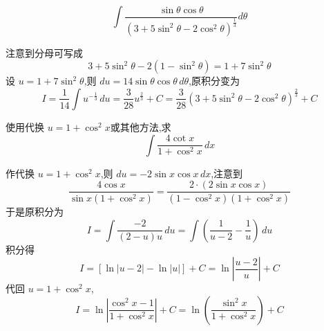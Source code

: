 \begin{questions}
    \question 
    \[
    \int \frac{\sin \theta \cos \theta}{(3+5\sin^2 \theta - 2\cos^2 \theta)^{\frac{1}{3}}} d\theta
    \]
    \begin{solution}
        注意到分母可写成
        \[ 
        3 + 5\sin^2 \theta - 2(1 - \sin^2 \theta) = 1 + 7\sin^2 \theta 
        \]
        设 $u = 1 + 7\sin^2 \theta$,则 $du = 14 \sin \theta \cos \theta \, d\theta$,原积分变为
        \[
        I = \frac{1}{14} \int u^{-\frac{1}{3}} \, du =\frac{3}{28} u^{\frac{2}{3}} + C = \frac{3}{28} (3+5\sin^2 \theta - 2\cos^2 \theta)^{\frac{2}{3}} + C
        \]
    \end{solution}

    \question 使用代换 $u = 1 + \cos^2 x$或其他方法,求
    \[
    \int \frac{4\cot x}{1+\cos^2 x} \, dx
    \]
    \begin{solution}
        作代换 $u = 1 + \cos^2 x$,则 $du = -2 \sin x \cos x \, dx$,注意到
        \[
        \frac{4\cos x}{\sin x (1+\cos^2 x)} = \frac{2 \cdot (2\sin x \cos x)}{(1-\cos^2 x)(1+\cos^2 x)}
        \]
        于是原积分为
        \[
        I = \int \frac{-2}{(2-u)u} \, du = \int \left(\frac{1}{u-2} - \frac{1}{u}\right) \, du
        \]
        积分得
        \[
        I = [\ln|u-2| - \ln|u|] + C = \ln\left| \frac{u-2}{u} \right| + C
        \]
        代回 $u = 1 + \cos^2 x$,
        \[
        I = \ln\left| \frac{\cos^2 x - 1}{1 + \cos^2 x} \right| + C = \ln\left( \frac{\sin^2 x}{1 + \cos^2 x} \right) + C
        \]
    \end{solution}


\end{questions}
